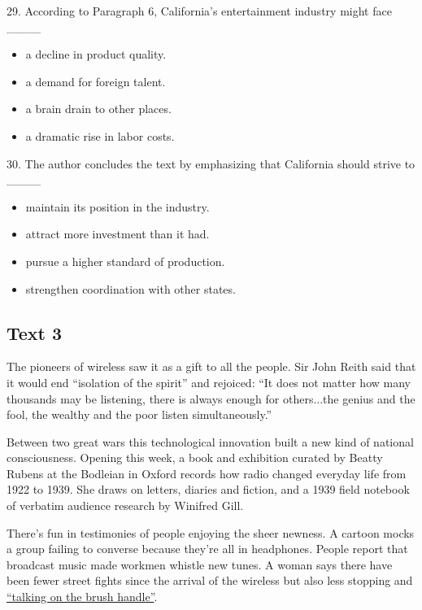 \documentclass[UTF8,11pt]{ctexart}
\begin{document}
29. According to Paragraph 6, California’s entertainment industry might face \_\_\_\_


\begin{itemize}[leftmargin=2em,itemsep=.2em,topsep=.4em]\item[A.] a decline in product quality.
\item[B.] a demand for foreign talent.
\item[C.] a brain drain to other places.
\item[D.] a dramatic rise in labor costs.
\end{itemize}

30. The author concludes the text by emphasizing that California should strive to \_\_\_\_


\begin{itemize}[leftmargin=2em,itemsep=.2em,topsep=.4em]\item[A.] maintain its position in the industry.
\item[B.] attract more investment than it had.
\item[C.] pursue a higher standard of production.
\item[D.] strengthen coordination with other states.
\end{itemize}

\subsection*{\textbf{Text 3}}


The pioneers of wireless saw it as a gift to all the people. Sir John Reith said that it would end “isolation of the spirit” and rejoiced: “It does not matter how many thousands may be listening, there is always enough for others...the genius and the fool, the wealthy and the poor listen simultaneously.”


Between two great wars this technological innovation built a new kind of national consciousness. Opening this week, a book and exhibition curated by Beatty Rubens at the Bodleian in Oxford records how radio changed everyday life from 1922 to 1939. She draws on letters, diaries and fiction, and a 1939 field notebook of verbatim audience research by Winifred Gill.


There’s fun in testimonies of people enjoying the sheer newness. A cartoon mocks a group failing to converse because they’re all in headphones. People report that broadcast music made workmen whistle new tunes. A woman says there have been fewer street fights since the arrival of the wireless but also less stopping and \uline{“talking on the brush handle”}.
\end{document}
